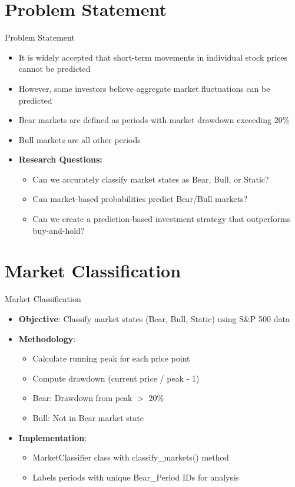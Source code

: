 \documentclass[aspectratio=169,xcolor=dvipsnames]{beamer}
\begin{document}
\section{Problem Statement}
\begin{frame}{Problem Statement}
	\begin{itemize}
		\item It is widely accepted that short-term movements in individual stock prices cannot be predicted
		\item However, some investors believe aggregate market fluctuations can be predicted
		\item Bear markets are defined as periods with market drawdown exceeding 20\%
		\item Bull markets are all other periods
		\item \textbf{Research Questions:}
		      \begin{itemize}
			      \item Can we accurately classify market states as Bear, Bull, or Static?
			      \item Can market-based probabilities predict Bear/Bull markets?
			      \item Can we create a prediction-based investment strategy that outperforms buy-and-hold?
		      \end{itemize}
	\end{itemize}
\end{frame}

\section{Market Classification}
\begin{frame}{Market Classification}
	\begin{itemize}
		\item \textbf{Objective}: Classify market states (Bear, Bull, Static) using S\&P 500 data
		\item \textbf{Methodology}:
		      \begin{itemize}
			      \item Calculate running peak for each price point
			      \item Compute drawdown (current price / peak - 1)
			      \item Bear: Drawdown from peak $>$ 20\%
			      \item Bull: Not in Bear market state
		      \end{itemize}
		\item \textbf{Implementation}:
		      \begin{itemize}
			      \item MarketClassifier class with classify\_markets() method
			      \item Labels periods with unique Bear\_Period IDs for analysis
		      \end{itemize}
	\end{itemize}
\end{frame}
\end{document}
